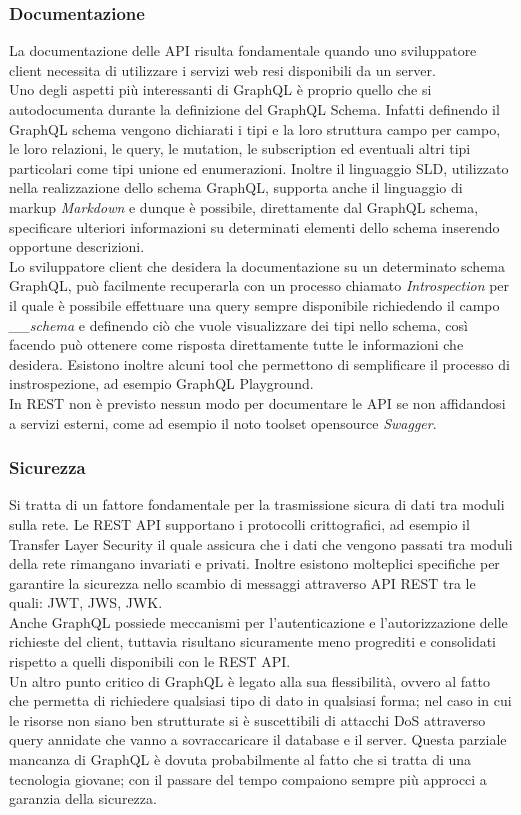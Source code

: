 \subsubsection*{Documentazione}
La documentazione delle API risulta fondamentale quando uno sviluppatore client necessita di utilizzare i servizi web resi disponibili da un server.\\
Uno degli aspetti più interessanti di GraphQL è proprio quello che si autodocumenta durante la definizione del GraphQL Schema. Infatti definendo il GraphQL schema vengono dichiarati i tipi e la loro struttura campo per campo, le loro relazioni, le query, le mutation, le subscription ed eventuali altri tipi particolari come tipi unione ed enumerazioni. Inoltre il linguaggio SLD, utilizzato nella realizzazione dello schema GraphQL, supporta anche il linguaggio di markup \textit{Markdown} e dunque è possibile, direttamente dal GraphQL schema, specificare ulteriori informazioni su determinati elementi dello schema inserendo opportune descrizioni.\\
Lo sviluppatore client che desidera la documentazione su un determinato schema GraphQL, può facilmente recuperarla con un processo chiamato \textit{Introspection} per il quale è possibile effettuare una query sempre disponibile richiedendo il campo \textit{\_\_schema} e definendo ciò che vuole visualizzare dei tipi nello schema, così facendo può ottenere come risposta direttamente tutte le informazioni che desidera. Esistono inoltre alcuni tool che permettono di semplificare il processo di instrospezione, ad esempio GraphQL Playground.\\
In REST non è previsto nessun modo per documentare le API se non affidandosi a servizi esterni, come ad esempio il noto toolset opensource \textit{Swagger}.
\subsubsection*{Sicurezza}
Si tratta di un fattore fondamentale per la trasmissione sicura di dati tra moduli sulla rete. Le REST API supportano i protocolli crittografici, ad esempio il Transfer Layer Security il quale assicura che i dati che vengono passati tra moduli della rete rimangano invariati e privati. Inoltre esistono molteplici specifiche per garantire la sicurezza nello scambio di messaggi attraverso API REST tra le quali: JWT, JWS, JWK.\\
Anche GraphQL possiede meccanismi per l'autenticazione e l'autorizzazione delle richieste del client, tuttavia risultano sicuramente meno progrediti e consolidati rispetto a quelli disponibili con le REST API.\\
Un altro punto critico di GraphQL è legato alla sua flessibilità, ovvero al fatto che permetta di richiedere qualsiasi tipo di dato in qualsiasi forma; nel caso in cui le risorse non siano ben strutturate si è suscettibili di attacchi DoS attraverso query annidate che vanno a sovraccaricare il database e il server. Questa parziale mancanza di GraphQL è dovuta probabilmente al fatto che si tratta di una tecnologia giovane; con il passare del tempo compaiono sempre più approcci a garanzia della sicurezza.
